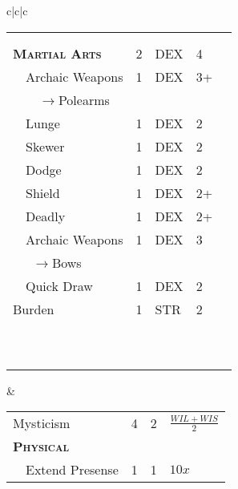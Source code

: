 \documentclass{article}
\begin{document}
\begin{tabular}{c|c|c}
\begin{tabular}{p{1.2in}|p{.15in}|p{.15in}|p{.15in}|p{.15in}}
    & & & & \\
    \hline
    & & & & \\
    \hline
    & & & & \\
    \hline
    \hline
    \hline
    \textsc{\textbf{Martial Arts}} & 2 & \tiny{DEX} & 4 & \\
    \hline
    ~~Archaic Weapons & 1 & \tiny{DEX} & 3+ & \\
    \hline
    ~~~~$\rightarrow$Polearms & & & & \\
    \hline
    ~~Lunge & 1 & \tiny{DEX} & 2 & \\
    \hline
    ~~Skewer & 1 & \tiny{DEX} & 2 & \\
    \hline
    ~~Dodge & 1 & \tiny{DEX} & 2 & \\
    \hline
    ~~Shield & 1 & \tiny{DEX} & 2+ & \\
    \hline
    ~~Deadly & 1 & \tiny{DEX} & 2+ & \\
    \hline
    ~~Archaic Weapons & 1 & \tiny{DEX} & 3 & \\
    \hline
    ~~~$\rightarrow$Bows & & & & \\
    \hline
    ~~Quick Draw& 1 & \tiny{DEX} & 2 & \\
    \hline
    Burden & 1 & \tiny{STR} & 2 & \\
    \hline
    & & & & \\
    \hline
    & & & & \\
    \hline
    & & & & \\
    \hline
    & & & & \\
    \hline
    & & & & \\
    \hline
    & & & & \\
    \hline
    & & & & \\
    \hline
    & & & & \\
    \hline
    & & & & \\
    \hline
    & & & & \\
  \end{tabular} &
    \begin{tabular}{p{1.4in}|p{.2in}|p{.2in}|p{.2in}}
    \textsmscbf{Name} & \texttyscbf{Rank}
    & \texttyscbf{Time} & \texttyscbf{MP} \\
    \hline
    \hline
    Mysticism & 4 & 2 & \tiny{$\frac{WIL+WIS}{2}$} \\
    \hline
    \hline
    \hline
    \textsc{\textbf{Physical}} & & & \\
    \hline
    ~~Extend Presense & 1 & 1 & $10x$ \\
    \hline

\end{tabular}
\end{tabular}
\end{document}
